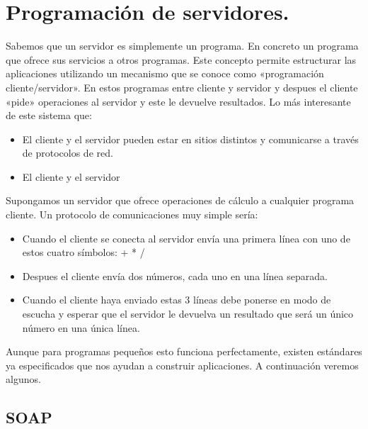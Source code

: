 \documentclass[letterpaper,10pt,spanish]{sphinxmanual}
\begin{document}
\section{Programación de servidores.}
\label{\detokenize{textos/tema4:programacion-de-servidores}}
Sabemos que un servidor es simplemente un programa. En concreto un programa que ofrece sus servicios a otros programas. Este concepto permite estructurar las aplicaciones utilizando un mecanismo que se conoce como «programación cliente/servidor». En estos programas  entre cliente y servidor y despues el cliente «pide» operaciones al servidor y este le devuelve resultados. Lo más interesante de este sistema que:
\begin{itemize}
\item {} 
El cliente y el servidor pueden estar en sitios distintos y comunicarse a través de protocolos de red.

\item {} 
El cliente y el servidor 

\end{itemize}

Supongamos un servidor que ofrece operaciones de cálculo a cualquier programa cliente. Un protocolo de comunicaciones muy simple sería:
\begin{itemize}
\item {} 
Cuando el cliente se conecta al servidor envía una primera línea con uno de estos cuatro símbolos: + \sphinxhyphen{} * /

\item {} 
Despues el cliente envía dos números, cada uno en una línea separada.

\item {} 
Cuando el cliente haya enviado estas 3 líneas debe ponerse en modo de escucha y esperar que el servidor le devuelva un resultado que será un único número en una única línea.

\end{itemize}

Aunque para programas pequeños esto funciona perfectamente, existen estándares ya especificados que nos ayudan a construir aplicaciones. A continuación veremos algunos.


\subsection{SOAP}
\label{\detokenize{textos/tema4:soap}}
\end{document}
